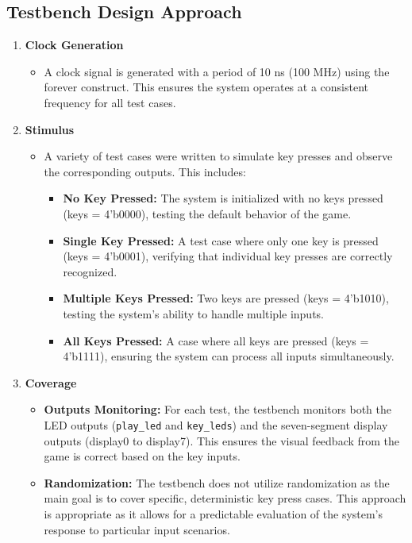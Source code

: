 \documentclass{report}
\begin{document}
\subsection{Testbench Design Approach}
\begin{enumerate}
    \item \textbf{Clock Generation}
    \begin{itemize}
        \item A clock signal is generated with a period of 10 ns (100 MHz) using the forever construct. This ensures the system operates at a consistent frequency for all test cases.
    \end{itemize}
    \item \textbf{Stimulus}
    \begin{itemize}
        \item A variety of test cases were written to simulate key presses and observe the corresponding outputs. This includes:
        \begin{itemize}
            \item \textbf{No Key Pressed:} The system is initialized with no keys pressed (keys = 4'b0000), testing the default behavior of the game.
            \item \textbf{Single Key Pressed:} A test case where only one key is pressed (keys = 4'b0001), verifying that individual key presses are correctly recognized.
            \item \textbf{Multiple Keys Pressed:} Two keys are pressed (keys = 4'b1010), testing the system's ability to handle multiple inputs.
            \item \textbf{All Keys Pressed:} A case where all keys are pressed (keys = 4'b1111), ensuring the system can process all inputs simultaneously.
        \end{itemize}
    \end{itemize}
    \item \textbf{Coverage}
    \begin{itemize}
        \item \textbf{Outputs Monitoring:} For each test, the testbench monitors both the LED outputs (\verb|play_led| and \verb|key_leds|) and the seven-segment display outputs (display0 to display7). This ensures the visual feedback from the game is correct based on the key inputs.
        \item \textbf{Randomization: } The testbench does not utilize randomization as the main goal is to cover specific, deterministic key press cases. This approach is appropriate as it allows for a predictable evaluation of the system's response to particular input scenarios.

\end{itemize}
\end{enumerate}
\end{document}
